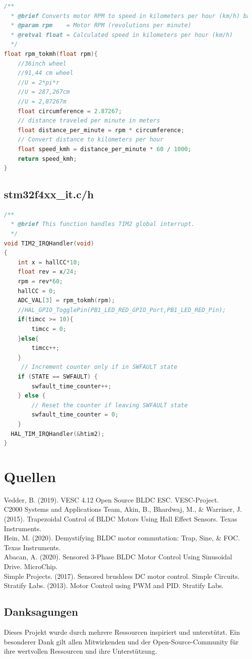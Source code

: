 \documentclass[paper=a4,11pt]{scrreprt}
\begin{document}
\begin{lstlisting}[language=C, caption=\textbf{float rpm\_tokmh(float rpm)},label={kmh}, mathescape=true, breaklines=true]
/**
  * @brief Converts motor RPM to speed in kilometers per hour (km/h) based on wheel circumference
  * @param rpm    = Motor RPM (revolutions per minute)
  * @retval float = Calculated speed in kilometers per hour (km/h)
  */
float rpm_tokmh(float rpm){
	//36inch wheel
	//91,44 cm wheel
	//U = 2*pi*r
	//U = 287,267cm
	//U = 2,87267m
	float circumference = 2.87267;
    // distance traveled per minute in meters
    float distance_per_minute = rpm * circumference;
    // Convert distance to kilometers per hour
    float speed_kmh = distance_per_minute * 60 / 1000;
    return speed_kmh;
}
\end{lstlisting}

\section{stm32f4xx\_it.c/h}
\begin{lstlisting}[language=C, caption=\textbf{void TIM2\_IRQHandler(void)},label={tim2}, mathescape=true, breaklines=true]
/**
  * @brief This function handles TIM2 global interrupt.
  */
void TIM2_IRQHandler(void)
{
	int x = hallCC*10;
	float rev = x/24;
	rpm = rev*60;
	hallCC = 0;
	ADC_VAL[3] = rpm_tokmh(rpm);
	//HAL_GPIO_TogglePin(PB1_LED_RED_GPIO_Port,PB1_LED_RED_Pin);
	if(timcc >= 10){
		timcc = 0;
	}else{
		timcc++;
	}
	 // Increment counter only if in SWFAULT state
	if (STATE == SWFAULT) {
		swfault_time_counter++;
	} else {
		// Reset the counter if leaving SWFAULT state
        swfault_time_counter = 0;
	}
  HAL_TIM_IRQHandler(&htim2);
}
\end{lstlisting}





\chapter{Quellen}
Vedder, B. (2019). VESC 4.12 Open Source BLDC ESC. VESC-Project.\\
C2000 Systems and Applications Team, Akin, B., Bhardwaj, M., \& Warriner, J. (2015). Trapezoidal Control of BLDC Motors Using Hall Effect Sensors. Texas Instruments.\\
Hein, M. (2020). Demystifying BLDC motor commutation: Trap, Sine, \& FOC. Texas Instruments.\\
Abacan, A. (2020). Sensored 3-Phase BLDC Motor Control Using Sinusoidal Drive. MicroChip.\\
Simple Projects. (2017). Sensored brushless DC motor control. Simple Circuits.\\
Stratify Labs. (2013). Motor Control using PWM and PID. Stratify Labs.\\
\section{Danksagungen}
Dieses Projekt wurde durch mehrere Ressourcen inspiriert und unterstützt.
Ein besonderer Dank gilt allen Mitwirkenden und der Open-Source-Community für ihre wertvollen Ressourcen und ihre Unterstützung.
\end{document}
